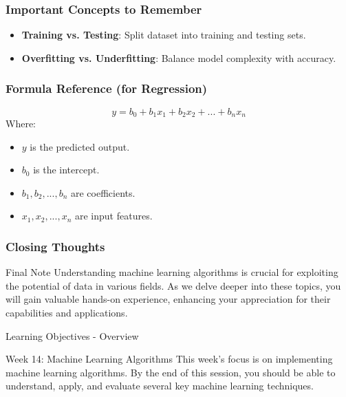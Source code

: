 \documentclass[aspectratio=169]{beamer}
\begin{document}
\begin{frame}[fragile]
    \frametitle{Important Concepts to Remember}
    \begin{itemize}
        \item \textbf{Training vs. Testing}: Split dataset into training and testing sets.
        \item \textbf{Overfitting vs. Underfitting}: Balance model complexity with accuracy.
    \end{itemize}
\end{frame}

\begin{frame}[fragile]
    \frametitle{Formula Reference (for Regression)}
    \begin{equation}
        y = b_0 + b_1x_1 + b_2x_2 + ... + b_nx_n
    \end{equation}
    Where:
    \begin{itemize}
        \item \(y\) is the predicted output.
        \item \(b_0\) is the intercept.
        \item \(b_1, b_2, ..., b_n\) are coefficients.
        \item \(x_1, x_2, ..., x_n\) are input features.
    \end{itemize}
\end{frame}

\begin{frame}[fragile]
    \frametitle{Closing Thoughts}
    \begin{block}{Final Note}
        Understanding machine learning algorithms is crucial for exploiting the potential of data in various fields. As we delve deeper into these topics, you will gain valuable hands-on experience, enhancing your appreciation for their capabilities and applications.
    \end{block}
\end{frame}

\begin{frame}[fragile]{Learning Objectives - Overview}
    \begin{block}{Week 14: Machine Learning Algorithms}
        This week's focus is on implementing machine learning algorithms. By the end of this session, you should be able to understand, apply, and evaluate several key machine learning techniques.
    \end{block}
\end{frame}
\end{document}
